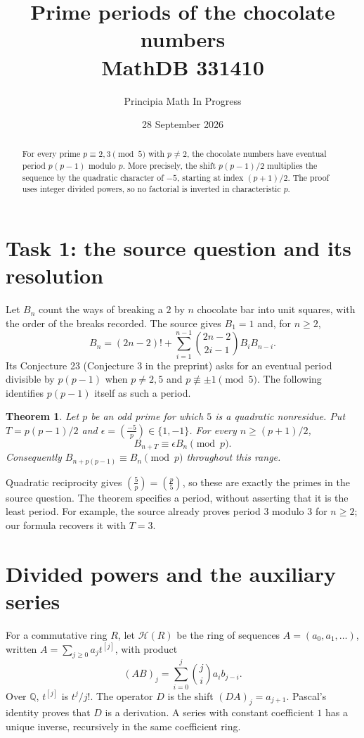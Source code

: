 \documentclass[11pt]{article}
\title{Prime periods of the chocolate numbers\\MathDB 331410}
\author{Principia Math In Progress}
\date{28 September 2026}
\newtheorem{theorem}{Theorem}
\begin{document}
\maketitle
\begin{abstract}
For every prime $p\equiv2,3\pmod5$ with $p\ne2$, the chocolate
numbers have eventual period $p(p-1)$ modulo $p$. More precisely,
the shift $p(p-1)/2$ multiplies the sequence by the quadratic character
of $-5$, starting at index $(p+1)/2$. The proof uses integer divided
powers, so no factorial is inverted in characteristic $p$.
\end{abstract}

\section*{Task 1: the source question and its resolution}
Let $B_n$ count the ways of breaking a $2$ by $n$ chocolate bar into
unit squares, with the order of the breaks recorded. The source
\cite{chocolate} gives $B_1=1$ and, for $n\ge2$,
\begin{equation}\label{rec}
B_n=(2n-2)!+\sum_{i=1}^{n-1}\binom{2n-2}{2i-1}B_iB_{n-i}.
\end{equation}
Its Conjecture 23 (Conjecture 3 in the preprint) asks for an eventual
period divisible by $p(p-1)$ when $p\ne2,5$ and $p\not\equiv\pm1\pmod5$.
The following identifies $p(p-1)$ itself as such a period.

\begin{theorem}\label{main}
Let $p$ be an odd prime for which $5$ is a quadratic nonresidue. Put
$T=p(p-1)/2$ and $\epsilon=\left(\frac{-5}{p}\right)\in\{1,-1\}$.
For every $n\ge(p+1)/2$,
\begin{equation}\label{half}
B_{n+T}\equiv\epsilon B_n\pmod p.
\end{equation}
Consequently $B_{n+p(p-1)}\equiv B_n\pmod p$ throughout this range.
\end{theorem}
Quadratic reciprocity gives $\left(\frac5p\right)=\left(\frac p5\right)$,
so these are exactly the primes in the source question.
The theorem specifies a period, without asserting that it is the
least period. For example, the source already proves period $3$ modulo
$3$ for $n\ge2$; our formula recovers it with $T=3$.

\section*{Divided powers and the auxiliary series}
For a commutative ring $R$, let $\mathcal H(R)$ be the ring of sequences
$A=(a_0,a_1,\ldots)$, written $A=\sum_{j\ge0}a_jt^{[j]}$, with product
\[
(AB)_j=\sum_{i=0}^j\binom ji a_i b_{j-i}.
\]
Over $\mathbb Q$, $t^{[j]}$ is $t^j/j!$. The operator $D$ is the shift
$(DA)_j=a_{j+1}$. Pascal's identity proves that $D$ is a derivation.
A series with constant coefficient $1$ has a unique inverse, recursively
in the same coefficient ring.
\end{document}

